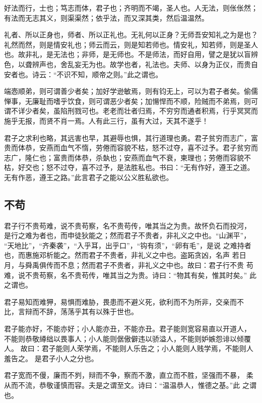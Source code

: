 \documentclass[]{article}
\begin{document}
好法而行，士也；笃志而体，君子也；齐明而不竭，圣人也。人无法，则伥伥然；有法而无志其义，则渠渠然；依乎法，而又深其类，然后温温然。

礼者、所以正身也，师者、所以正礼也。无礼何以正身？无师吾安知礼之为是也？礼然而然，则是情安礼也；师云而云，则是知若师也。情安礼，知若师，则是圣人也。故非礼，是无法也；非师，是无师也。不是师法，而好自用，譬之是犹以盲辨色，以聋辨声也，舍乱妄无为也。故学也者，礼法也。夫师、以身为正仪，而贵自安者也。诗云：``不识不知，顺帝之则。''此之谓也。

端悫顺弟，则可谓善少者矣；加好学逊敏焉，则有钧无上，可以为君子者矣。偷儒惮事，无廉耻而嗜乎饮食，则可谓恶少者矣；加愓悍而不顺，险贼而不弟焉，则可谓不详少者矣，虽陷刑戮可也。老老而壮者归焉，不穷穷而通者积焉，行乎冥冥而施乎无报，而贤不肖一焉。人有此三行，虽有大过，天其不遂乎！

君子之求利也略，其远害也早，其避辱也惧，其行道理也勇。君子贫穷而志广，富贵而体恭，安燕而血气不惰，劳倦而容貌不枯，怒不过夺，喜不过予。君子贫穷而志广，隆仁也；富贵而体恭，杀埶也；安燕而血气不衰，柬理也；劳倦而容貌不枯，好交也；怒不过夺，喜不过予，是法胜私也。书曰：``无有作好，遵王之道。无有作恶，遵王之路。''此言君子之能以公义胜私欲也。

\hypertarget{header-n20}{%
\subsection{不苟}\label{header-n20}}

君子行不贵苟难，说不贵苟察，名不贵苟传，唯其当之为贵。故怀负石而投河，
是行之难为者也，而申徒狄能之；然而君子不贵者，非礼义之中也。``山渊平''，
``天地比''，``齐秦袭''，``入乎耳，出乎口''，``钩有须''，``卵有毛''，是说
之难持者也，而惠施邓析能之。然而君子不贵者，非礼义之中也。盗跖贪凶，名声
若日月，与舜禹俱传而不息；然而君子不贵者，非礼义之中也。故曰：君子行不贵
苟难，说不贵苟察，名不贵苟传，唯其当之为贵。诗曰：``物其有矣，惟其时矣。''
此之谓也。

君子易知而难狎，易惧而难胁，畏患而不避义死，欲利而不为所非，交亲而不
比，言辩而不辞，荡荡乎其有以殊于世也。

君子能亦好，不能亦好；小人能亦丑，不能亦丑。君子能则宽容易直以开道人，
不能则恭敬繜绌以畏事人；小人能则倨傲僻违以骄溢人，不能则妒嫉怨诽以倾覆人。
故曰：君子能则人荣学焉，不能则人乐告之；小人能则人贱学焉，不能则人羞告之。
是君子小人之分也。

君子宽而不僈，廉而不刿，辩而不争，察而不激，直立而不胜，坚强而不暴，
柔从而不流，恭敬谨慎而容。夫是之谓至文。诗曰：``温温恭人，惟德之基。''此
之谓也。
\end{document}
